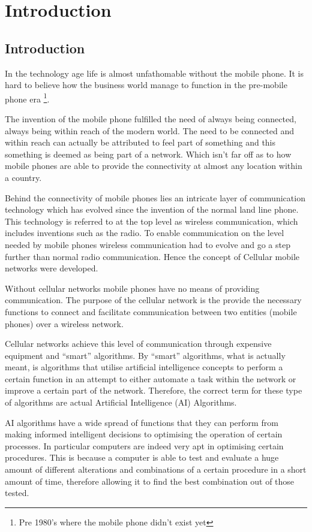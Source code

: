 \chapter{Introduction}
\section{Introduction}
In the technology age life is almost unfathomable without the mobile phone. It is hard to believe how the business world manage to function in the pre-mobile phone era \footnote{Pre 1980's where the mobile phone didn't exist yet}. 

The invention of the mobile phone fulfilled the need of always being connected, always being within reach of the modern world. The need to be connected and within reach can actually be attributed to feel part of something and this something is deemed as being part of a network. Which isn't far off as to how mobile phones are able to provide the connectivity at almost any location within a country.

Behind the connectivity of mobile phones lies an intricate layer of communication technology which has evolved since the invention of the normal land line phone. This technology is referred to at the top level as wireless communication, which includes inventions such as the radio. To enable communication on the level needed by mobile phones wireless communication had to evolve and go a step further than normal radio communication. Hence the concept of Cellular mobile networks were developed.

Without cellular networks mobile phones have no means of providing communication. The purpose of the cellular network is the provide the necessary functions to connect and facilitate communication between two entities (mobile phones) over a wireless network. 

Cellular networks achieve this level of communication through expensive equipment and ``smart'' algorithms. By ``smart'' algorithms, what is actually meant, is algorithms that utilise artificial intelligence concepts to perform a certain function in an attempt to either automate a task within the network or improve a certain part of the network. Therefore, the correct term for these type of algorithms are actual Artificial Intelligence (AI) Algorithms.

AI algorithms have a wide spread of functions that they can perform from making informed intelligent decisions to optimising the operation of certain processes. In particular computers are indeed very apt in optimising certain procedures. This is because a computer is able to test and evaluate a huge amount of different alterations and combinations of a certain procedure in a short amount of time, therefore allowing it to find the best combination out of those tested.


